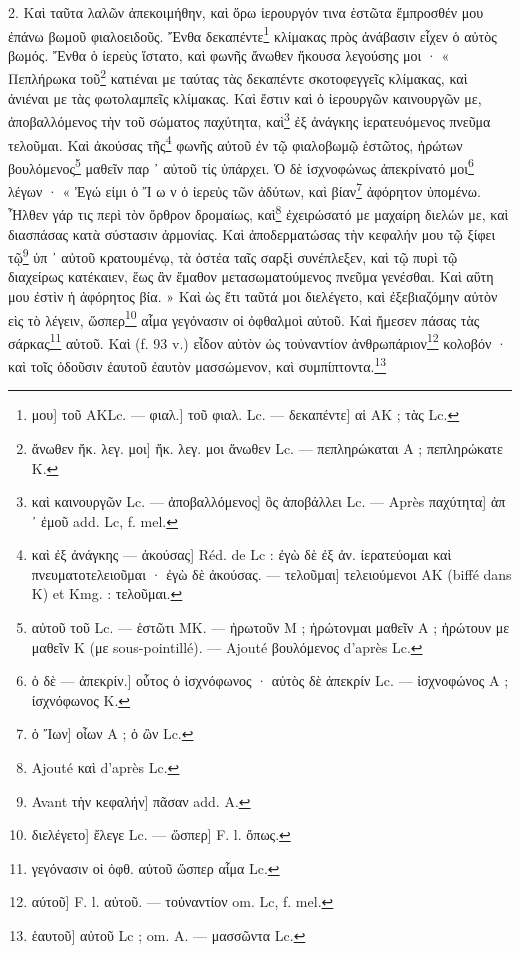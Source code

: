 \documentclass[a4paper, 11pt, oneside, polutonikogreek, french]{article}
\begin{document}
2. Καὶ ταῦτα λαλῶν ἀπεκοιμήθην, καὶ ὅρω ἱερουργόν τινα ἑστῶτα ἔμπροσθέν μου ἐπάνω βωμοῦ φιαλοειδοῦς. Ἔνθα δεκαπέντε\footnote{μου] τοῦ AKLc. --- φιαλ.] τοῦ φιαλ. Lc. --- δεκαπέντε] αἱ AK ; τὰς Lc.} κλίμακας πρὸς ἀνάβασιν εἶχεν ὁ αὐτὸς βωμός. Ἔνθα ὁ ίερεὺς ἵστατο, καὶ φωνῆς ἄνωθεν ἤκουσα λεγούσης μοι · « Πεπλήρωκα τοῦ\footnote{ἄνωθεν ἤκ. λεγ. μοι] ἤκ. λεγ. μοι ἄνωθεν Lc. --- πεπληρώκαται A ; πεπληρώκατε K.} κατιέναι με ταύτας τὰς δεκαπέντε σκοτοφεγγεῖς κλίμακας, καὶ ἀνιέναι με τὰς φωτολαμπεῖς κλίμακας. Καὶ ἔστιν καὶ ὁ ἱερουργῶν καινουργῶν με, ἀποβαλλόμενος τὴν τοῦ σώματος παχύτητα, καὶ\footnote{καὶ καινουργῶν Lc. --- ἀποβαλλόμενος] ὃς ἀποβάλλει Lc. --- Après παχύτητα] ἀπ ᾽ ἐμοῦ add. Lc, f. mel.} ἐξ ἀνάγκης ἱερατευόμενος πνεῦμα τελοῦμαι. Καὶ ἀκούσας τῆς\footnote{καὶ ἐξ ἀνάγκης --- ἀκούσας] Réd. de Lc : ἐγὼ δὲ ἐξ ἀν. ίερατεύομαι καὶ πνευματοτελειοῦμαι · ἐγὼ δὲ ἀκούσας. --- τελοῦμαι] τελειούμενοι AK (biffé dans K) et Kmg. : τελοῦμαι.} φωνῆς αὐτοῦ ἐν τῷ φιαλοβωμῷ ἑστῶτος, ἠρώτων βουλόμενος\footnote{αὐτοῦ τοῦ Lc. --- ἑστῶτι MK. --- ἠρωτοῦν M ; ἡρώτονμαι μαθεῖν A ; ἠρώτουν με μαθεῖν K (με sous-pointillé). --- Ajouté βουλόμενος d'après Lc.} μαθεῖν παρ ᾽ αὐτοῦ τίς ὑπάρχει. Ὁ δὲ ἰσχνοφώνως ἀπεκρίνατό μοι\footnote{ὁ δὲ --- ἀπεκρίν.] οὗτος ὁ ἰσχνόφωνος · αὐτὸς δὲ ἀπεκρίν Lc. --- ἰσχνοφώνος A ; ίσχνόφωνος K.} λέγων · « Ἐγώ εἰμι ὁ Ἴ ω ν ὁ ἰερεὐς τῶν ἀδύτων, καὶ βίαν\footnote{ὁ Ἴων] οἶων A ; ὁ ὢν Lc.} ἀφόρητον ὑπομένω. Ἦλθεν γάρ τις περὶ τὸν ὄρθρον δρομαίως, καὶ\footnote{Ajouté καὶ d'après Lc.} ἐχειρώσατό με μαχαίρη διελών με, καὶ διασπάσας κατὰ σύστασιν ἀρμονίας. Καὶ ἀποδερματώσας τὴν κεφαλήν μου τῷ ξίφει τῷ\footnote{Avant τὴν κεφαλήν] πᾶσαν add. A.} ὑπ ᾽ αὐτοῦ κρατουμένῳ, τὰ ὀστέα ταῖς σαρξὶ συνέπλεξεν, καὶ τῷ πυρὶ τῷ διαχείρως κατέκαιεν, ἕως ἂν ἔμαθον μετασωματούμενος πνεῦμα γενέσθαι. Καὶ αὕτη μου ἐστὶν ἡ ἀφόρητος βία. » Καὶ ὡς ἔτι ταῦτά μοι διελέγετο, καὶ ἐξεβιαζόμην αὐτὸν εὶς τὸ λέγειν, ὥσπερ\footnote{διελέγετο] ἔλεγε Lc. --- ὥσπερ] F. l. ὄπως.} αἷμα γεγόνασιν οἱ ὀφθαλμοὶ αὐτοῦ. Καὶ ἤμεσεν πάσας τὰς σάρκας\footnote{γεγόνασιν οἱ ὀφθ. αὐτοῦ ὥσπερ αἷμα Lc.} αὐτοῦ. Καὶ (f. 93 v.) εἶδον αὐτὸν ὡς τοὐναντίον ἀνθρωπάριον\footnote{αύτοῦ] F. l. αὐτοῦ. --- τοὐναντίον om. Lc, f. mel.} κολοβόν · καὶ τοῖς ὀδοῦσιν ἐαυτοῦ ἐαυτὸν μασσώμενον, καὶ συμπίπτοντα.\footnote{ἑαυτοῦ] αὐτοῦ Lc ; om. A. --- μασσῶντα Lc.}
\end{document}
